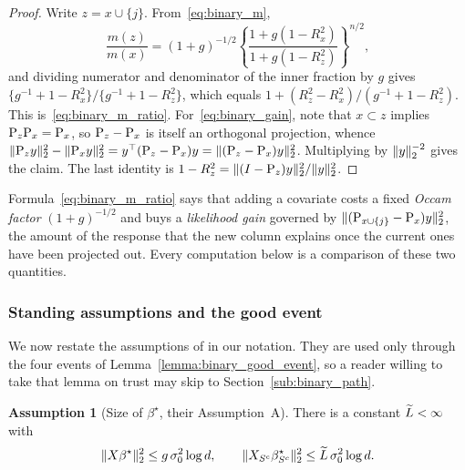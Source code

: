 \documentclass[aos]{imsart}%
\DeclarePairedDelimiter{\norm}{\lVert}{\rVert}
\theoremstyle{plain}
\theoremstyle{definition}
\newtheorem{assumption}[theorem]{Assumption}
\begin{document}
    \begin{proof}
        Write $z=x\cup\{j\}$. From~\eqref{eq:binary_m},
        \begin{equation*}
            \frac{m(z)}{m(x)}=(1+g)^{-1/2}
            \left\{\frac{1+g(1-R^{2}_{x})}{1+g(1-R^{2}_{z})}\right\}^{n/2},
        \end{equation*}
        and dividing numerator and denominator of the inner fraction by $g$
        gives $\{g^{-1}+1-R^{2}_x\}/\{g^{-1}+1-R^{2}_z\}$, which equals
        $1+(R^{2}_z-R^{2}_x)/(g^{-1}+1-R^{2}_z)$. This
        is~\eqref{eq:binary_m_ratio}. For~\eqref{eq:binary_gain}, note that
        $x\subset z$ implies $\mathrm{P}_z\mathrm{P}_x=\mathrm{P}_x$, so $\mathrm{P}_z-\mathrm{P}_x$ is
        itself an orthogonal projection, whence
        $\norm{\Proj_zy}_2^{2}-\norm{\Proj_xy}_2^{2}
        =y^{\top}(\Proj_z-\Proj_x)y=\norm{(\Proj_z-\Proj_x)y}_2^{2}$.
        Multiplying by $\norm{y}_2^{-2}$ gives the claim. The last identity is
        $1-R^{2}_z=\norm{(I-\Proj_z)y}_2^{2}/\norm{y}_2^{2}$.
    \end{proof}

    Formula~\eqref{eq:binary_m_ratio} says that adding a covariate costs a fixed
    \emph{Occam factor} $(1+g)^{-1/2}$ and buys a \emph{likelihood gain}
    governed by $\norm{(\Proj_{x\cup\{j\}}-\Proj_x)y}_2^{2}$, the amount of the
    response that the new column explains once the current ones have been
    projected out. Every computation below is a comparison of these two
    quantities.


    \subsubsection{Standing assumptions and the good event}
    \label{sub:binary_assumptions}

    We now restate the assumptions of \citet{YangWainwrightJordan2016} in our
    notation. They are used only through the four events of
    Lemma~\ref{lemma:binary_good_event}, so a reader willing to take that lemma
    on trust may skip to Section~\ref{sub:binary_path}.

    \begin{assumption}[Size of $\beta^\star$, their Assumption~A]
        \label{ass:binary_A}
        There is a constant $\widetilde{L}<\infty$ with
        \begin{equation*}
            \norm{X\beta^\star}_2^{2}\leq g\,\sigma_0^{2}\log d,
            \qquad
            \norm{X_{S^{c}}\beta^\star_{S^{c}}}_2^{2}
            \leq\Ltil\,\sigma_0^{2}\log d .
        \end{equation*}
    \end{assumption}
\end{document}
